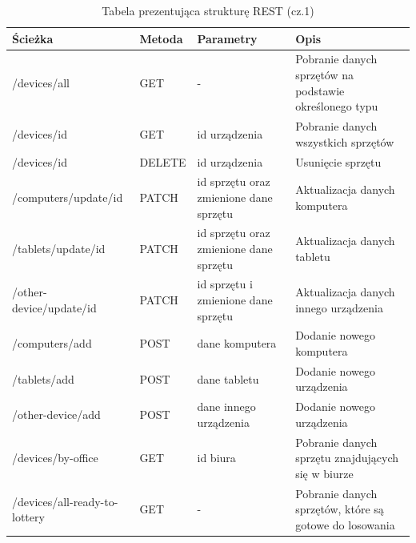 \begin{table}[H]\small
	\centering
\caption{Tabela prezentująca strukturę REST (cz.1)}
\label{tab:rest1}
\begin{tabularx}{\linewidth}{|X|l|p{3cm}|X|}
    \hline
    Ścieżka & Metoda & Parametry & Opis  \\
    \hline \hline
		/devices/all 	& GET & - & Pobranie danych sprzętów na podstawie określonego typu \\
		\hline
		/devices/{id} & GET & id urządzenia 	& Pobranie danych wszystkich sprzętów\\
    \hline
		/devices/{id}	& DELETE & id urządzenia 	& Usunięcie sprzętu\\
    \hline
		 /computers/update/id & PATCH & id sprzętu oraz zmienione dane sprzętu& Aktualizacja danych komputera\\
		\hline
		 /tablets/update/id & PATCH & id sprzętu oraz zmienione dane sprzętu& Aktualizacja danych tabletu\\
		\hline	 
		/other-device/update/id & PATCH & id sprzętu i zmienione dane sprzętu & Aktualizacja danych innego urządzenia\\
		\hline
			 /computers/add & POST	& dane komputera 	& Dodanie nowego komputera	\\
    \hline
		/tablets/add & POST	& dane tabletu & Dodanie nowego urządzenia	\\
    \hline
		/other-device/add & POST	& dane innego urządzenia 	& Dodanie nowego urządzenia	\\
    \hline
		/devices/by-office& GET	& id biura 	& Pobranie danych sprzętu znajdujących się w biurze\\
    \hline
		/devices/all-ready-to-lottery& GET	& - & Pobranie danych sprzętów, które są gotowe do losowania\\
    \hline
		

\end{tabularx}
\end{table}
